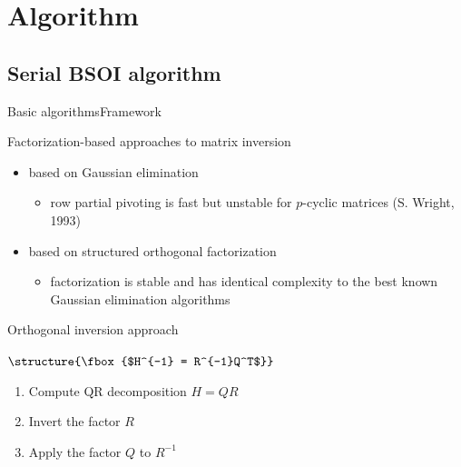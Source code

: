 \documentclass[xcolor=table,final]{beamer} %
\begin{document}
\section{Algorithm}

\subsection{Serial BSOI algorithm}

\begin{frame}{Basic algorithms}{Framework}
  \begin{block}{Factorization-based approaches to matrix inversion}
    \begin{itemize}
    \item based on Gaussian elimination
      \begin{itemize}
      \item row partial pivoting is fast but unstable for $p$-cyclic matrices (S. Wright, 1993)
      \end{itemize}
    \item based on structured orthogonal factorization
      \begin{itemize}
      \item factorization is stable and has 
        identical complexity to the best known Gaussian elimination algorithms
      \end{itemize}
    \end{itemize}
  \end{block}

  \pause
  \begin{block}{Orthogonal inversion approach}
    \begin{centering}
      $\structure{\fbox{$H^{-1} = R^{-1}Q^T$}}$
    \end{centering}
    \begin{enumerate}
    \item Compute QR decomposition $H = QR$
    \item Invert the factor $R$ 
    \item Apply the factor $Q$ to $R^{-1}$ 
    \end{enumerate}
  \end{block}
\end{frame}
\end{document}
